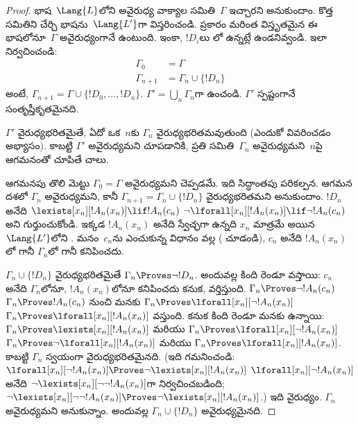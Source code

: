 \documentclass[../../../include/open-logic-section]{subfiles}
\begin{document}
\begin{proof}
భాష~$\Lang{L}$లోని అవైరుధ్య వాక్యాల సమితి~$\Gamma$ ఇచ్చారని
అనుకుందాం. కొత్త   సమితిని
చేర్చి భాషను~$\Lang{L'}$గా విస్తరించండి. 
ప్రకారం మరింత విస్తృతమైన ఈ భాషలోనూ~$\Gamma$ అవైరుధ్యంగానే ఉంటుంది.
ఇంకా, $!D_i$లు లో ఉన్నట్లే ఉండనివ్వండి. ఇలా
నిర్వచించండి:
\begin{align*}
\Gamma_0 & = \Gamma \\
\Gamma_{n+1} & = \Gamma_n \cup \{!D_n \}
\end{align*}
అంటే, $\Gamma_{n+1} = \Gamma \cup \{ !D_0, \dots, !D_n \}$.
$\Gamma' = \bigcup_{n} \Gamma_n$గా ఉంచండి. $\Gamma'$ స్పష్టంగానే
సంతృప్తీకృతమైనది.

$\Gamma'$ వైరుధ్యభరితమైతే, ఏదో ఒక~$n$కు $\Gamma_n$
వైరుధ్యభరితమవుతుంది (ఎందుకో వివరించడం అభ్యాసం). కాబట్టి $\Gamma'$
అవైరుధ్యమని చూపడానికి, ప్రతి సమితి~$\Gamma_n$ అవైరుధ్యమని~$n$పై
ఆగమనంతో చూపితే చాలు.

ఆగమనపు తొలి మెట్టు $\Gamma_0 = \Gamma$ అవైరుధ్యమని చెప్పడమే. ఇది సిద్ధాంతపు
పరికల్పన. ఆగమన దశలో $\Gamma_{n}$ అవైరుధ్యమని, కానీ
$\Gamma_{n+1} = \Gamma_n \cup \{!D_n\}$ వైరుధ్యభరితమని అనుకుందాం.
$!D_n$ అనేది
{$\lexists[x_{n}][!A_{n}(x_n)] \lif !A_{n}(c_{n})$}
{$\lnot\lforall[x_{n}][!A_{n}(x_n)] \lif \lnot !A_{n}(c_{n})$}
అని గుర్తుంచుకోండి. ఇక్కడ $!A_n(x_n)$ అనేది స్వేచ్ఛగా ఉన్నది
$x_n$ మాత్రమే అయిన~$\Lang{L'}$లోని . మనం~$c_n$ను
ఎంచుకున్న విధానం వల్ల ( చూడండి), $c_n$ అనేది
$!A_n(x_n)$లో గానీ $\Gamma_n$లో గానీ కనిపించదు.

$\Gamma_n \cup \{!D_n\}$ వైరుధ్యభరితమైతే $\Gamma_n \Proves \lnot
!D_n$. అందువల్ల కింది రెండూ వస్తాయి:
$c_n$ అనేది $\Gamma_n$లోనూ, $!A_n(x_n)$లోనూ కనిపించదు కనుక,
వర్తిస్తుంది. 
{$\Gamma_n \Proves \lnot !A_n(c_n)$}
{$\Gamma_n \Proves !A_n(c_n)$}
నుంచి మనకు
{$\Gamma_n \Proves \lforall[x_n][\lnot !A_n(x_n)]$}
{$\Gamma_n \Proves \lforall[x_n][!A_n(x_n)]$}
వస్తుంది. కనుక కింది రెండూ మనకు ఉన్నాయి:
{$\Gamma_n \Proves \lexists[x_n][!A_n(x_n)]$ మరియు
$\Gamma_n \Proves \lforall[x_n][\lnot !A_n(x_n)]$}
{$\Gamma_n \Proves \lnot\lforall[x_n][!A_n(x_n)]$ మరియు
$\Gamma_n \Proves \lforall[x_n][!A_n(x_n)]$}.
కాబట్టి $\Gamma_n$ స్వయంగా వైరుధ్యభరితమైనది.
{(ఇది గమనించండి:
{$\lforall[x_n][\lnot !A_n(x_n)] \Proves
  \lnot\lexists[x_n][!A_n(x_n)]$}
{$\lforall[x_n][\lnot !A_n(x_n)]$ అనేది
  $\lnot\lexists[x_n][\lnot\lnot !A_n(x_n)]$గా నిర్వచించబడింది;
  $\lnot\lexists[x_n][\lnot\lnot !A_n(x_n)] \Proves
  \lnot\lexists[x_n][!A_n(x_n)]$}.)
}{}
ఇది వైరుధ్యం. $\Gamma_n$ అవైరుధ్యమని అనుకున్నాం. అందువల్ల
$\Gamma_n \cup \{ !D_n\}$ అవైరుధ్యమైనది.
\end{proof}
\end{document}

